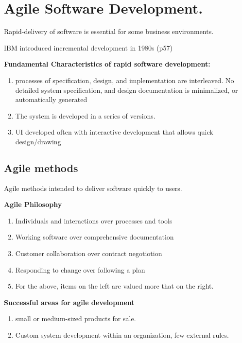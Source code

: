 \documentclass{article}
\begin{document}
\setcounter{section}{2}
\section{Agile Software Development.}

Rapid-delivery of software is essential for some business environments.  

IBM introduced incremental development in 1980s (p57)

\textbf{Fundamental Characteristics of rapid software development:}
    \begin{enumerate}
        \item processes of specification, design, and implementation are interleaved.
        No detailed system specification, and design documentation is minimalized, or automatically generated
    \item The system is developed in a series of versions.
    \item UI developed often with interactive development that allows quick design/drawing
    \end{enumerate}

\subsection{Agile methods}

Agile methods intended to deliver software quickly to users.

\textbf{Agile Philosophy}
\begin{enumerate}
    \item Individuals and interactions over processes and tools
    \item Working software over comprehensive documentation
    \item Customer collaboration over contract negotiotion
    \item Responding to change over following a plan
    \item For the above, items on the left are valued more that on the right.
\end{enumerate}

\textbf{Successful areas for agile development}
\begin{enumerate}
    \item small or medium-sized products for sale.
    \item Custom system development within an organization, few external rules.
\end{enumerate}
\end{document}
